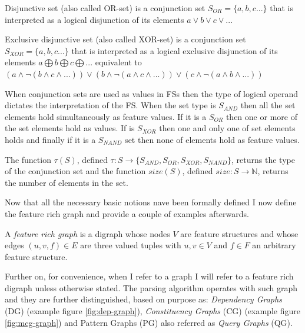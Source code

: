 \begin{definition}\label{def:or-set}
	Disjunctive set (also called OR-set) is a conjunction set $S_{OR}=\{a,b,c...\}$ that is interpreted as a logical disjunction of its elements $a \vee b \vee c \vee ...$
\end{definition}

\begin{definition}\label{def:xor-set}
	Exclusive disjunctive set (also called XOR-set) is a conjunction set $S_{XOR}=\{a,b,c...\}$ that is interpreted as a logical exclusive disjunction of its elements $a \bigoplus b \bigoplus c \bigoplus ...$ equivalent to $ (a \wedge \neg (b \wedge c \wedge ... )) \vee (b \wedge \neg (a \wedge c \wedge ...)) \vee (c \wedge \neg (a \wedge b \wedge ...)) $
\end{definition}

When conjunction sets are used as values in FSs then the type of logical operand dictates the interpretation of the FS. When the set type is $S_{AND}$ then all the set elements hold simultaneously as feature values. If it is a $S_{OR}$ then one or more of the set elements hold as values. If is $S_{XOR}$ then one and only one of set elements holds and finally if it is a $S_{NAND}$ set then none of elements hold as feature values.

The function $\tau(S)$, defined $\tau:S \rightarrow \{S_{AND},S_{OR},S_{XOR},S_{NAND} \}$, returns the type of the conjunction set and the function $size(S)$, defined $size:S \rightarrow \mathbb{N}$, returns the number of elements in the set.
 
Now that all the necessary basic notions nave been formally defined I now define the feature rich graph and provide a couple of examples afterwards. 
 
\begin{definition}\label{def:feature-rich-graph}
	A \textit{feature rich graph} is a digraph whose nodes $V$ are feature structures and whose edges $(u,v,f) \in E$ are three valued tuples with $ u,v \in V$ and $f \in F$ an arbitrary feature structure.
\end{definition}

Further on, for convenience, when I refer to a graph I will refer to a feature rich digraph unless otherwise stated. The parsing algorithm operates with such graph and they are further distinguished, based on purpose as: \textit{Dependency Graphs} (DG) (example figure \ref{fig:dep-graph}), \textit{Constituency Graphs} (CG) (example figure \ref{fig:mcg-graph}) and Pattern Graphs (PG) also referred as \textit{Query Graphs} (QG).


